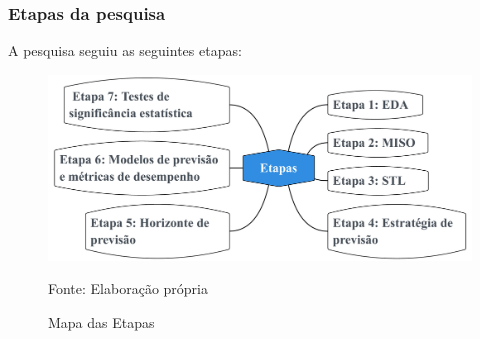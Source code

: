     \subsubsection{Etapas da pesquisa}\label{subsubsec:etp}
    A pesquisa seguiu as seguintes etapas:
    \begin{figure}[H]
    	\centering
    	\caption{Mapa das Etapas}
    	\label{fig:etapas}
    	\includegraphics[width=1\linewidth]{Introducao/Figuras/Etapas}
    	
    	Fonte: Elaboração própria
    \end{figure}
